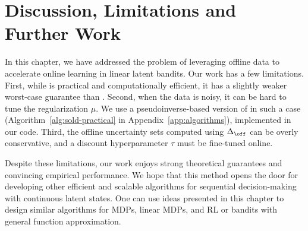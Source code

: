 \section{Discussion, Limitations and Further Work}\label{sec:de-finetti}\label{defn:coherence}\label{thm:definetti}
In this chapter, we have addressed the problem of leveraging offline data to accelerate online learning in linear latent bandits.  Our work has a few limitations. First, while  is practical and computationally efficient, it has a slightly weaker worst-case guarantee than . Second, when the data is noisy, it can be hard to tune the regularization $\mu$. We use a pseudoinverse-based version of  in such a case (Algorithm~\ref{alg:sold-practical} in Appendix~\ref{app:algorithms}), implemented in our code. Third, the offline uncertainty sets computed using $\Delta_{\off}$ can be overly conservative, and a discount hyperparameter $\tau$ must be fine-tuned online.

Despite these limitations, our work enjoys strong theoretical guarantees and convincing empirical performance. We hope that this method opens the door for developing other efficient and scalable algorithms for sequential decision-making with continuous latent states. One can use ideas presented in this chapter to design similar algorithms for MDPs, linear MDPs, and RL or bandits with general function approximation. 

